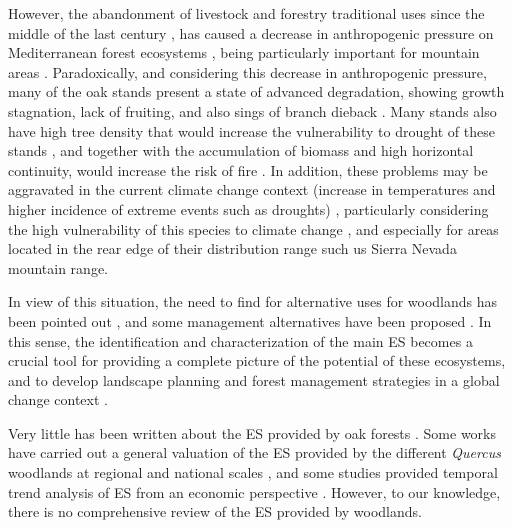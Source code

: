 However, the abandonment of livestock and forestry traditional uses since the middle of the last century \autocites{MacDonaldetal2000AgriculturalAbandonment}, has caused a decrease in anthropogenic pressure on Mediterranean forest ecosystems \autocites{ValbuenaCarabanaetal2010HistoricalRecent}, being particularly important for mountain areas \autocites{JimenezOlivenciaetal2015MedioSiglo,JimenezOlivenciaetal2015EvolucionUsos,Piasetal2014ColonizationAbandoned}. Paradoxically, and considering this decrease in anthropogenic pressure, many of the \Qp oak stands present a state of advanced degradation, showing growth stagnation, lack of fruiting, and also sings of branch dieback  \autocites{Canellasetal2004GrowthResponse, Bravoetal2008SelviculturaMontes, ValbuenaCarabanaGil2014EfectosGestion, PiqueVericat2015EvolutionPerspectives, Piqueetal2018Spain}. Many stands also have high tree density that would increase the vulnerability to drought of these stands \autocite{McDowelletal2020PervasiveShifts}, and together with the accumulation of biomass and high horizontal continuity, would increase the risk of fire \autocites{Bravoetal2008SelviculturaMontes,GarciaJimenez20099230Robledales}. In addition, these problems may be aggravated in the current climate change context (increase in temperatures and higher incidence of extreme events such as droughts) \autocites{IPCC2013ClimateChange,Spinonietal2018WillDrought}, particularly considering the high vulnerability of this species to climate change \autocites{Benitoetal2011SimulatingPotential,GarciaValdesetal2013ChasingMoving,SanchezdeDiosetal2009PresentFuture,GeaIzquierdoetal2013GrowthProjections}, and especially for areas located in the rear edge of their distribution range such us Sierra Nevada mountain range.  

In view of this situation, the need to find for alternative uses for \Qp woodlands has been pointed out \autocites{MesonMontoya1985VegetacionForestal,SanMigueletal2012BosquesMatorrales}, and some management alternatives have been proposed \autocite[\emph{e.g.} sylvopastoral uses, see][]{HerreraCalvo2016UsoPastoral}. In this sense, the identification and characterization of the main ES becomes a crucial tool for providing a complete picture of the potential of these ecosystems, and to develop landscape planning and forest management strategies in a global change context \autocites{Piqueetal2018Spain}. 

Very little has been written about the ES provided by oak forests \autocites{Maranonetal2012OakTrees,Maranonetal2012EstadoTendencia,MorenoLlorcaetal2012MontanaMediterranea}. Some works have carried out a general valuation of the ES provided by the different \emph{Quercus} woodlands at regional and national scales \autocite{SanMigueletal2012BosquesMatorrales,Maranonetal2012EstadoTendencia,Sousaetal2020EcosystemServices}, and some studies provided temporal trend analysis of ES from an economic perspective \autocites[see][for an example for dehesas of California and Spain]{Caparrosetal2013EconomicsEcosystem}. However, to our knowledge, there is no comprehensive review of the ES provided by \Qp woodlands. 


